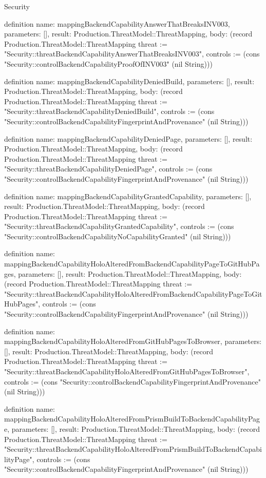 \begin{lexlean}{Security}
\begin{semanticmodule}
definition{
  name: mappingBackendCapabilityAnswerThatBreaksINV003,
  parameters: [],
  result: Production.ThreatModel::ThreatMapping,
  body: (record Production.ThreatModel::ThreatMapping {threat := "Security::threatBackendCapabilityAnswerThatBreaksINV003", controls := (cons "Security::controlBackendCapabilityProofOfINV003" (nil String))})
}

definition{
  name: mappingBackendCapabilityDeniedBuild,
  parameters: [],
  result: Production.ThreatModel::ThreatMapping,
  body: (record Production.ThreatModel::ThreatMapping {threat := "Security::threatBackendCapabilityDeniedBuild", controls := (cons "Security::controlBackendCapabilityFingerprintAndProvenance" (nil String))})
}

definition{
  name: mappingBackendCapabilityDeniedPage,
  parameters: [],
  result: Production.ThreatModel::ThreatMapping,
  body: (record Production.ThreatModel::ThreatMapping {threat := "Security::threatBackendCapabilityDeniedPage", controls := (cons "Security::controlBackendCapabilityFingerprintAndProvenance" (nil String))})
}

definition{
  name: mappingBackendCapabilityGrantedCapability,
  parameters: [],
  result: Production.ThreatModel::ThreatMapping,
  body: (record Production.ThreatModel::ThreatMapping {threat := "Security::threatBackendCapabilityGrantedCapability", controls := (cons "Security::controlBackendCapabilityNoCapabilityGranted" (nil String))})
}

definition{
  name: mappingBackendCapabilityHoloAlteredFromBackendCapabilityPageToGitHubPages,
  parameters: [],
  result: Production.ThreatModel::ThreatMapping,
  body: (record Production.ThreatModel::ThreatMapping {threat := "Security::threatBackendCapabilityHoloAlteredFromBackendCapabilityPageToGitHubPages", controls := (cons "Security::controlBackendCapabilityFingerprintAndProvenance" (nil String))})
}

definition{
  name: mappingBackendCapabilityHoloAlteredFromGitHubPagesToBrowser,
  parameters: [],
  result: Production.ThreatModel::ThreatMapping,
  body: (record Production.ThreatModel::ThreatMapping {threat := "Security::threatBackendCapabilityHoloAlteredFromGitHubPagesToBrowser", controls := (cons "Security::controlBackendCapabilityFingerprintAndProvenance" (nil String))})
}

definition{
  name: mappingBackendCapabilityHoloAlteredFromPrismBuildToBackendCapabilityPage,
  parameters: [],
  result: Production.ThreatModel::ThreatMapping,
  body: (record Production.ThreatModel::ThreatMapping {threat := "Security::threatBackendCapabilityHoloAlteredFromPrismBuildToBackendCapabilityPage", controls := (cons "Security::controlBackendCapabilityFingerprintAndProvenance" (nil String))})
}


\end{semanticmodule}
\end{lexlean}
